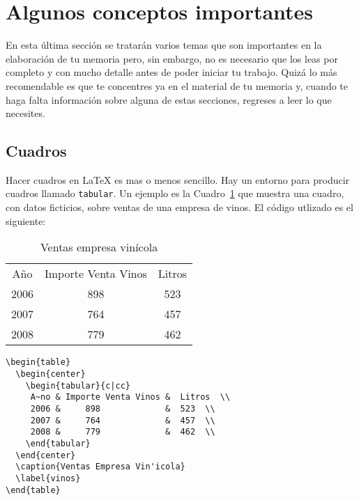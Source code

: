 \section{Algunos conceptos importantes}

En esta \'ultima secci\'on se tratar\'an varios temas que son importantes en la
elaboraci\'on de tu memoria pero, sin embargo, no es necesario que los leas por completo
y con mucho detalle antes de poder iniciar tu trabajo. Quiz\'a lo m\'as
recomendable es que te concentres ya en el material de tu memoria y, cuando
te haga falta informaci\'on sobre alguna de estas secciones, regreses a leer
lo que necesites.


\subsection{Cuadros}
Hacer cuadros en \LaTeX{} es mas o menos sencillo. Hay un entorno para producir cuadros
llamado \texttt{tabular}. Un ejemplo es la Cuadro~\ref{vinos} que muestra una cuadro, con datos ficticios, 
sobre ventas de una empresa de vinos. El c\'odigo utlizado es el siguiente:


\begin{table}
	\begin{center}
		\begin{tabular}{c|cc}
      A\~no & Importe Venta Vinos  &    Litros \\ 
      2006  &     898              &    523  \\
      2007  &     764              &    457  \\
      2008  &     779              &    462  \\
		\end{tabular}
	\end{center}
	\caption{Ventas empresa vin\'icola}
	\label{vinos}
\end{table}

\begin{verbatim}
\begin{table}
  \begin{center}
    \begin{tabular}{c|cc}
     A~no & Importe Venta Vinos &  Litros  \\ 
     2006 &     898             &  523  \\
     2007 &     764             &  457  \\
     2008 &     779             &  462  \\
    \end{tabular}
  \end{center}
  \caption{Ventas Empresa Vin'icola}
  \label{vinos}
\end{table}
\end{verbatim}

